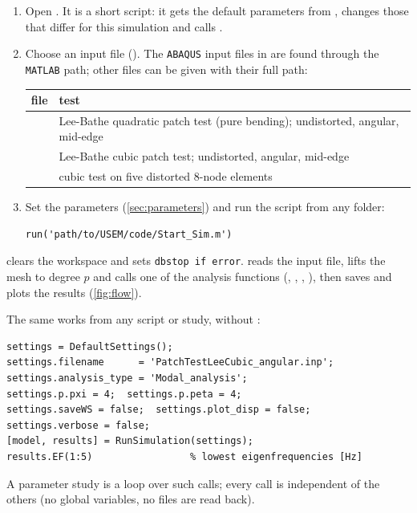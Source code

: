 \begin{enumerate}
  \item Open . It is a short script: it gets the default
    parameters from , changes those that differ for this
    simulation and calls .
  \item Choose an input file (). The \texttt{ABAQUS} input files in
     are found through the \texttt{MATLAB} path; other files
    can be given with their full path:
    \begin{center}
      \begin{tabularx}{0.95\linewidth}{@{}lL@{}}
        \toprule
        file & test \\
        \midrule
         & Lee-Bathe quadratic patch test
          (pure bending); undistorted, angular, mid-edge \\
         & Lee-Bathe cubic patch test;
          undistorted, angular, mid-edge \\
         & cubic test on five distorted
          8-node elements \\
        \bottomrule
      \end{tabularx}
    \end{center}
  \item Set the parameters (\cref{sec:parameters}) and run the script from any
    folder:
\begin{lstlisting}
run('path/to/USEM/code/Start_Sim.m')
\end{lstlisting}
\end{enumerate}
 clears the workspace and sets \texttt{dbstop if error}.
 reads the input file, lifts the mesh to degree $p$ and calls
one of the analysis functions (, ,
, ), then saves and plots the
results (\cref{fig:flow}).

The same works from any script or study, without :
\begin{lstlisting}
settings = DefaultSettings();
settings.filename      = 'PatchTestLeeCubic_angular.inp';
settings.analysis_type = 'Modal_analysis';
settings.p.pxi = 4;  settings.p.peta = 4;
settings.saveWS = false;  settings.plot_disp = false;  settings.verbose = false;
[model, results] = RunSimulation(settings);
results.EF(1:5)                 % lowest eigenfrequencies [Hz]
\end{lstlisting}
A parameter study is a loop over such calls; every call is independent of the
others (no global variables, no files are read back).

